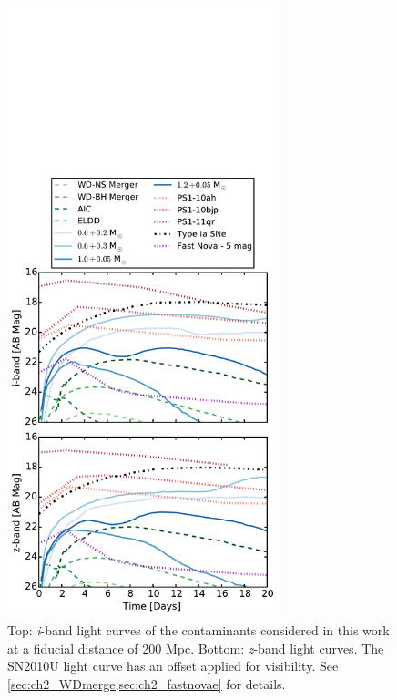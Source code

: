 \begin{figure}[h!]
\centering
\includegraphics[width=0.7\textwidth]{./figs/chapter2/f2.pdf}
\caption{\singlespace Top: {\em i}-band light curves of the contaminants considered in this work at a fiducial distance of 200 Mpc. Bottom: {\em z}-band light curves. The SN2010U light curve has an offset applied for visibility. See \cref{sec:ch2_WDmerge,sec:ch2_fastnovae} for details.}
\label{fig:ch2_LCcont}
\end{figure}

